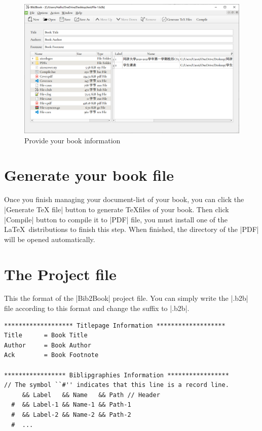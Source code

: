 \documentclass{article}
\begin{document}
    \begin{figure}[htb]
        \centering
        \includegraphics[width=\textwidth]{figures/project.png}
        \caption{Provide your book information}
        \label{fig:information}
    \end{figure}

    \section{Generate your book file}

    Once you finish managing your document-list of your book, you can click the |Generate TeX file| button to generate \TeX files of your book. Then click |Compile| button to compile it to |PDF| file, you must install one of the \LaTeX\ distributions to finish this step. When finished, the directory of the |PDF| will be opened automatically.

    \section{The Project file}

    This the format of the |Bib2Book| project file. You can simply write the |.b2b| file according to this format and change the suffix to |.b2b|.

\begin{lstlisting}[language=b2b, columns=fixed]
******************* Titlepage Information *******************
Title      = Book Title
Author     = Book Author
Ack        = Book Footnote

***************** Biblipgraphies Information *****************
// The symbol ``#'' indicates that this line is a record line.
     && Label   && Name   && Path // Header
  #  && Label-1 && Name-1 && Path-1 
  #  && Label-2 && Name-2 && Path-2
  #  ...
\end{lstlisting}
\end{document}
